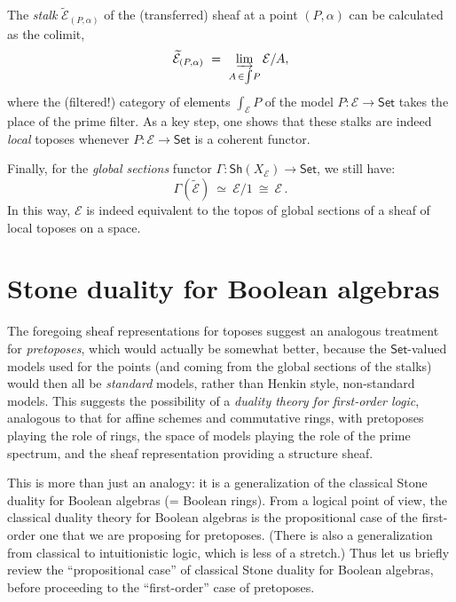 \documentclass[12pt]{article}
\newcommand{\E}{\ensuremath{\mathcal{E}}}
\newcommand{\Set}{\ensuremath{\mathsf{Set}}}
\theoremstyle{remark}
\theoremstyle{definition}
\begin{document}
The \emph{stalk} $\widetilde{\E}_{(P,\alpha)}$ of the (transferred) sheaf at a point $(P,\alpha)$ can be calculated as the colimit,
\[
\widetilde{\E}_{(P,\alpha)}\ =\ \varinjlim_{A\,\in\int\!{P}} \E/A, 
\]
where the (filtered!) category of elements $\int_\E\!{P}$ of the model $P:\E\rightarrow\Set$ takes the place of the prime filter.   As a key step, one shows that these stalks are indeed \emph{local} toposes whenever $P:\E\rightarrow\Set$ is a coherent functor.

Finally, for the \emph{global sections} functor $\Gamma:\mathsf{Sh}(X_\E)\rightarrow\Set$, we still have:
$$\Gamma(\widetilde{\E})\ \simeq\ \E/1\ \cong\ \E\,.$$  In this way, $\E$ is indeed equivalent to the topos of global sections of a sheaf of local toposes on a space.






%

\section{Stone duality for Boolean algebras}

The foregoing sheaf representations for toposes suggest an analogous treatment for \emph{pretoposes}, which would actually be somewhat better, because the $\Set$-valued models used for the points (and coming from the global sections of the stalks) would then all be \emph{standard} models, rather than Henkin style, non-standard models. This suggests the possibility of a \emph{duality theory for first-order logic}, analogous to that for affine schemes and commutative rings, with  pretoposes playing the role of rings, the space of models playing the role of the prime spectrum, and the sheaf representation providing a structure sheaf.

This is more than just an analogy: it is a generalization of the classical Stone duality for Boolean algebras (= Boolean rings). From a logical point of view, the classical duality theory for Boolean algebras is the propositional case of the first-order one that we are proposing for pretoposes.  (There is also a generalization from classical to intuitionistic logic, which is less of a stretch.)  Thus let us briefly review the ``propositional case'' of classical Stone duality for Boolean algebras, before proceeding to the ``first-order'' case of pretoposes.  
\end{document}
